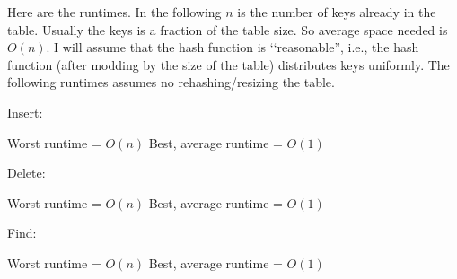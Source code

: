Here are the runtimes.
In the following $n$ is the number of keys already in the table.
Usually the keys is a fraction of the table size.
So average space needed is $O(n)$.
I will assume that the hash function is \lq\lq reasonable'', i.e.,
the hash function (after modding by the size of the table)
distributes keys uniformly.
The following runtimes assumes no rehashing/resizing the table.
\begin{enumerate}
  \li Insert:
  \begin{tightlist}
    \li Worst runtime = $O(n)$
    \li Best, average runtime = $O(1)$
  \end{tightlist}
  \li Delete:
  \begin{tightlist}
    \li Worst runtime = $O(n)$
    \li Best, average runtime = $O(1)$
  \end{tightlist}
  \li Find:
  \begin{tightlist}
    \li Worst runtime = $O(n)$
    \li Best, average runtime = $O(1)$
  \end{tightlist}
\end{enumerate}


\newpage
